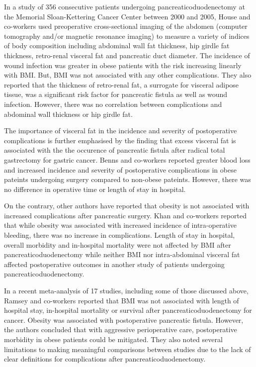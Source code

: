 In a study of 356 consecutive patients undergoing pancreaticoduodenectomy at the Memorial Sloan-Kettering Cancer Center between 2000 and 2005, House and co-workers used preoperative cross-sectional imaging of the abdomen (computer tomography and/or magnetic resonance imaging) to measure a variety of indices of body composition including abdominal wall fat thickness, hip girdle fat thickness, retro-renal visceral fat and pancreatic duct diameter. \parencite{house_preoperative_2008} The incidence of wound infection was greater in obese patients with the risk increasing linearly with BMI. But, BMI was not associated with any other complications. They also reported that the thickness of retro-renal fat, a surrogate for visceral adipose tissue, was a significant risk factor for pancreatic fistula as well as wound infection. However, there was no correlation between complications and abdominal wall thickness or hip girdle fat. 

The importance of visceral fat in the incidence and severity of postoperative complications is further emphasised by the finding that excess visceral fat is associated with the the occurence of pancreatic fistula after radical total gastrectomy for gastric cancer. Benns and co-workers reported greater blood loss and increased incidence and severity of postoperative complications in obese pateints undergoing surgery compared to non-obese pateints. However, there was no difference in operative time or length of stay in hospital. \parencite{benns_impact_2009}

On the contrary, other authors have reported that obesity is not associated with increased complications after pancreatic surgery. Khan and co-workers reported that while obesity was associated with increased incidence of intra-operative bleeding, there was no increase in complications. \parencite{khan_does_2010} Length of stay in hospital, overall morbidity and in-hospital mortality were not affected by BMI after pancreaticoduodenectomy \parencite{tsai_impact_2010} while neither BMI nor intra-abdominal visceral fat affected postoperative outcomes in another study of patients undergoing pancreaticoduodenectomy. \parencite{balentine_obesity_2011}

In a recent meta-analysis of 17 studies, including some of those discussed above, Ramsey and co-workers reported that BMI was not associated with length of hospital stay, in-hospital mortality  or survival after pancreaticoduodenectomy for cancer. Obesity was associated with postoperative pancreatic fistula. However, the authors concluded that with aggressive perioperative care, postoperative morbidity in obese patients could be mitigated. They also noted several limitations to making meaningful comparisons between studies due to the lack of clear definitions for complications after pancreaticoduodenectomy. \parencite{ramsey_body_2011}


